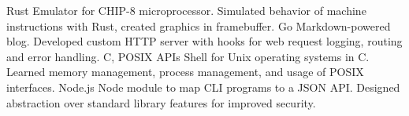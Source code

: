 \documentclass{article}
\begin{document}
\normalsize
{}
{Rust}
{Emulator for CHIP-8 microprocessor. Simulated behavior of machine instructions with
Rust, created graphics in framebuffer.}
\vspace{1.5mm}
{Go}
{Markdown-powered blog. Developed custom HTTP server with hooks for web request logging, routing 
and error handling.}
\vspace{1.5mm}
{C, POSIX APIs}
{Shell for Unix operating systems in C. Learned memory management, process management,
and usage of POSIX interfaces. }
\vspace{1.5mm}
{Node.js}
{Node module to map CLI programs to a JSON API. Designed abstraction over standard
library features for improved security.}
\end{document}
